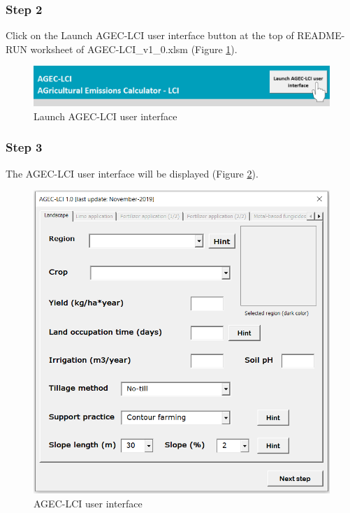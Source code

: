 \documentclass[openany]{book}
\begin{document}
\hypertarget{step-2}{%
\subsubsection*{Step 2}\label{step-2}}

Click on the Launch AGEC-LCI user interface button at the top of README-RUN worksheet of AGEC-LCI\_v1\_0.xlsm (Figure \ref{fig:agec-lci-step1}).

\begin{figure}[ht]

{\centering \includegraphics[width=0.85\linewidth]{Figures/agec_lci_step1} 

}

\caption{Launch AGEC-LCI user interface}\label{fig:agec-lci-step1}
\end{figure}

\hypertarget{step-3}{%
\subsubsection*{Step 3}\label{step-3}}

The AGEC-LCI user interface will be displayed (Figure \ref{fig:agec-lci-step2}).

\begin{figure}[ht]

{\centering \includegraphics[width=0.65\linewidth]{Figures/agec_lci_step2} 

}

\caption{AGEC-LCI user interface}\label{fig:agec-lci-step2}
\end{figure}
\end{document}

